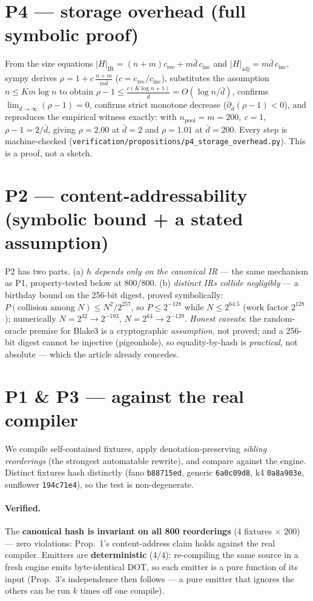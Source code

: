 \documentclass[11pt]{article}
\begin{document}
\section{P4 --- storage overhead (full symbolic proof)}
From the size equations $|H|_{\mathrm{IR}} = (n+m)c_{\mathrm{rec}} + m\bar d\,c_{\mathrm{inc}}$ and
$|H|_{\mathrm{adj}} = m\bar d\,c_{\mathrm{inc}}$, \textsf{sympy} derives
$\rho = 1 + c\,\frac{n+m}{m\bar d}$ ($c=c_{\mathrm{rec}}/c_{\mathrm{inc}}$), substitutes the assumption
$n\le K m\log n$ to obtain $\rho-1 \le \frac{c(K\log n+1)}{\bar d} = O(\log n/\bar d)$, confirms
$\lim_{\bar d\to\infty}(\rho-1)=0$, confirms strict monotone decrease ($\partial_{\bar d}(\rho-1)<0$), and
reproduces the empirical witness exactly: with $n_{\mathrm{pool}}=m=200,\ c=1$, $\rho-1=2/\bar d$, giving
$\rho=2.00$ at $\bar d=2$ and $\rho=1.01$ at $\bar d=200$. Every step is machine-checked
(\texttt{verification/propositions/p4\_storage\_overhead.py}). This is a proof, not a sketch.

\section{P2 --- content-addressability (symbolic bound + a stated assumption)}
P2 has two parts. (a) \emph{$h$ depends only on the canonical IR} --- the same mechanism as P1, property-tested
below at 800/800. (b) \emph{distinct IRs collide negligibly} --- a birthday bound on the 256-bit digest, proved
symbolically: $P(\text{collision among }N) \le N^2/2^{257}$, so $P\le 2^{-128}$ while $N\le 2^{64.5}$ (work factor
$2^{128}$); numerically $N{=}2^{32}\!\to\!2^{-193}$, $N{=}2^{64}\!\to\!2^{-129}$. \emph{Honest caveats}: the
random-oracle premise for Blake3 is a cryptographic \emph{assumption}, not proved; and a 256-bit digest cannot be
injective (pigeonhole), so equality-by-hash is \emph{practical}, not absolute --- which the article already
concedes.

\section{P1 \& P3 --- against the real compiler}
We compile self-contained fixtures, apply denotation-preserving \emph{sibling reorderings} (the strongest
automatable rewrite), and compare against the engine. Distinct fixtures hash distinctly (fano \texttt{b88715ed},
generic \texttt{6a0c09d8}, k4 \texttt{0a8a903e}, sunflower \texttt{194c71e4}), so the test is non-degenerate.

\paragraph{Verified.} The \textbf{canonical hash is invariant on all 800 reorderings} (4 fixtures $\times$ 200) ---
zero violations: Prop.~1's content-address claim holds against the real compiler. Emitters are
\textbf{deterministic} (4/4): re-compiling the same source in a fresh engine emits byte-identical DOT, so each
emitter is a pure function of its input (Prop.~3's independence then follows --- a pure emitter that ignores the
others can be run $k$ times off one compile).
\end{document}
